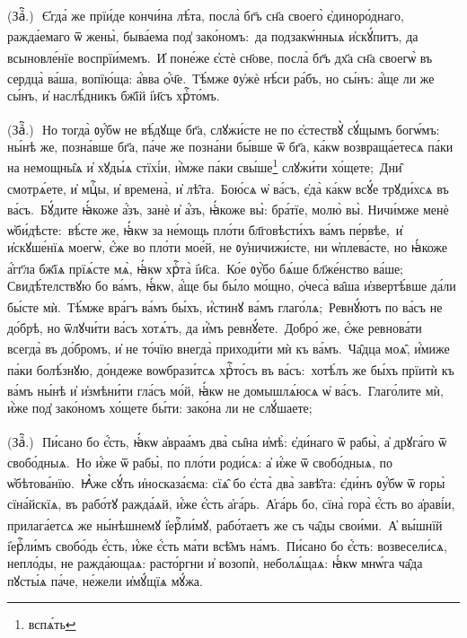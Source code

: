 (Заⷱ҇\:.)~\textsuperscript{}\,Є҆гда́ же прїи́де кончи́на лѣ́та, посла̀ бг҃ъ сн҃а своего̀ є҆диноро́днаго, ражда́емаго ѿ жены̀, быва́ема под̾ зако́номъ: \textsuperscript{}\,да подзакѡ́нныѧ и҆скꙋ́питъ, да всыновле́нїе воспрїи́мемъ. \textsuperscript{}\,И҆ поне́же є҆стѐ сн҃ове, посла̀ бг҃ъ дх҃а сн҃а своегѡ̀ въ сердца̀ ва́ша, вопїю́ща: а҆́вва ѻ҆́ч҃е. \textsuperscript{}\,Тѣ́мже ᲂу҆жѐ нѣ́си ра́бъ, но сы́нъ: а҆́ще ли же сы́нъ, и҆ наслѣ́дникъ бж҃їй і҆и҃съ хрⷭ҇то́мъ.

(Заⷱ҇\:.)~\textsuperscript{}\,Но тогда̀ ᲂу҆́бѡ не вѣ́дꙋще бг҃а, слꙋжи́сте не по є҆стествꙋ̀ сꙋ́щымъ богѡ́мъ: \textsuperscript{}\,ны́нѣ же, позна́вше бг҃а, па́че же позна́ни бы́вше ѿ бг҃а, ка́кѡ возвраща́етесѧ па́ки на немощны̑ѧ и҆ хꙋды́ѧ стїхі́и, и҆̀мже па́ки свы́ше\footnote{вспѧ́ть} слꙋжи́ти хо́щете; \textsuperscript{}\,Дни̑ смотрѧ́ете, и҆ мцⷭ҇ы, и҆ времена̀, и҆ лѣ̑та. \textsuperscript{}\,Бою́сѧ ѡ҆ ва́съ, є҆да̀ ка́кѡ всꙋ́е трꙋди́хсѧ въ ва́съ. \textsuperscript{}\,Бꙋ́дите ꙗ҆́коже а҆́зъ, занѐ и҆ а҆́зъ, ꙗ҆́коже вы̀: бра́тїе, молю̀ вы̀. Ничи́мже менѐ ѡ҆би́дѣсте: \textsuperscript{}\,вѣ́сте же, ꙗ҆́кѡ за не́мощь пло́ти бл҃говѣсти́хъ ва́мъ пе́рвѣе, \textsuperscript{}\,и҆ и҆скꙋше́нїѧ моегѡ̀, є҆́же во пло́ти мое́й, не ᲂу҆ничижи́сте, ни ѡ҆плева́сте, но ꙗ҆́коже а҆́гг҃ла бж҃їѧ прїѧ́сте мѧ̀, ꙗ҆́кѡ хрⷭ҇та̀ і҆и҃са. \textsuperscript{}\,Ко́е ᲂу҆̀бо бѧ́ше бл҃же́нство ва́ше; Свидѣ́телствꙋю бо ва́мъ, ꙗ҆́кѡ, а҆́ще бы бы́ло мо́щно, ѻ҆чеса̀ ва̑ша и҆звертѣ́вше да́ли бы́сте мѝ. \textsuperscript{}\,Тѣ́мже вра́гъ ва́мъ бы́хъ, и҆́стинꙋ ва́мъ глаго́лѧ; \textsuperscript{}\,Ревнꙋ́ютъ по ва́съ не до́брѣ, но ѿлꙋчи́ти ва́съ хотѧ́тъ, да и҆̀мъ ревнꙋ́ете. \textsuperscript{}\,Добро́ же, є҆́же ревнова́ти всегда̀ въ до́бромъ, и҆ не то́чїю внегда̀ приходи́ти мѝ къ ва́мъ. \textsuperscript{}\,Ча̑дца моѧ̑, и҆́миже па́ки болѣ́знꙋю, до́ндеже воѡбрази́тсѧ хрⷭ҇то́съ въ ва́съ: \textsuperscript{}\,хотѣ́лъ же бы́хъ прїитѝ къ ва́мъ ны́нѣ и҆ и҆змѣни́ти гла́съ мо́й, ꙗ҆́кѡ не домышлѧ́юсѧ ѡ҆ ва́съ. \textsuperscript{}\,Глаго́лите мѝ, и҆̀же под̾ зако́номъ хо́щете бы́ти: зако́на ли не слꙋ́шаете;

(Заⷱ҇.)~\textsuperscript{}\,Пи́сано бо є҆́сть, ꙗ҆́кѡ а҆враа́мъ два̀ сы̑на и҆мѣ̀: є҆ди́наго ѿ рабы̀, а҆ дрꙋга́го ѿ свобо́дныѧ. \textsuperscript{}\,Но и҆́же ѿ рабы̀, по пло́ти роди́сѧ: а҆ и҆́же ѿ свобо́дныѧ, по ѡ҆бѣтова́нїю. \textsuperscript{}\,Ꙗ҆̀же сꙋ́ть и҆носказа́єма: сїѧ̑ бо є҆ста̀ два̀ завѣ̑та: є҆ди́нъ ᲂу҆́бѡ ѿ горы̀ сїна́йскїѧ, въ рабо́тꙋ ражда́ѧй, и҆́же є҆́сть а҆га́рь. \textsuperscript{}\,А҆га́рь бо, сїна̀ гора̀ є҆́сть во а҆раві́и, прилага́етсѧ же ны́нѣшнемꙋ і҆ерⷭ҇ли́мꙋ, рабо́таетъ же съ ча̑ды свои́ми. \textsuperscript{}\,А҆ вы́шнїй і҆ерⷭ҇ли́мъ свобо́дь є҆́сть, и҆́же є҆́сть ма́ти всѣ̑мъ на́мъ. \textsuperscript{}\,Пи́сано бо є҆́сть: возвесели́сѧ, непло́ды, не ражда́ющаѧ: расто́ргни и҆ возопѝ, неболѧ́щаѧ: ꙗ҆́кѡ мнѡ́га ча̑да пꙋсты́ѧ па́че, не́жели и҆мꙋ́щїѧ мꙋ́жа.

